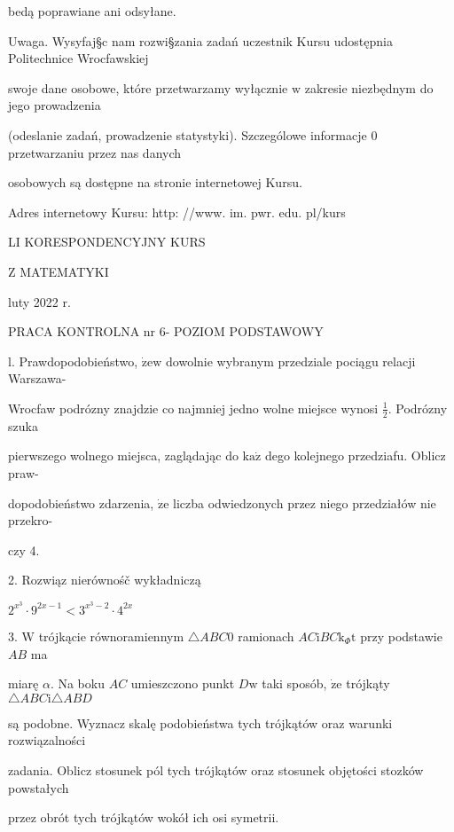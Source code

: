 \documentclass[a4paper,12pt]{article}
\begin{document}
bedą poprawiane ani odsyłane.

Uwaga. Wysyfaj\S c nam rozwi\S zania zadań uczestnik Kursu udostępnia Politechnice Wrocfawskiej

swoje dane osobowe, które przetwarzamy wyłącznie $\mathrm{w}$ zakresie niezbędnym do jego prowadzenia

(odeslanie zadań, prowadzenie statystyki). Szczególowe informacje $0$ przetwarzaniu przez nas danych

osobowych są dostępne na stronie internetowej Kursu.

Adres internetowy Kursu: http: //www. im. pwr. edu. pl/kurs







LI KORESPONDENCYJNY KURS

Z MATEMATYKI

luty 2022 r.

PRACA KONTROLNA nr 6- POZIOM PODSTAWOWY

l. Prawdopodobieństwo, $\dot{\mathrm{z}}\mathrm{e}\mathrm{w}$ dowolnie wybranym przedziale pociągu relacji Warszawa-

Wrocfaw podrózny znajdzie co najmniej jedno wolne miejsce wynosi $\displaystyle \frac{1}{2}$. Podrózny szuka

pierwszego wolnego miejsca, zaglądając do $\mathrm{k}\mathrm{a}\dot{\mathrm{z}}$ dego kolejnego przedziafu. Oblicz praw-

dopodobieństwo zdarzenia, $\dot{\mathrm{z}}\mathrm{e}$ liczba odwiedzonych przez niego przedziałów nie przekro-

czy 4.

2. Rozwiąz nierównośč wykładniczą

$2^{x^{3}}\cdot 9^{2x-1}<3^{x^{3}-2}\cdot 4^{2x}$

3. $\mathrm{W}$ trójkącie równoramiennym $\triangle ABC0$ ramionach $AC\mathrm{i}BC\mathrm{k}_{\Phi}\mathrm{t}$ przy podstawie $AB$ ma

miarę $\alpha$. Na boku $AC$ umieszczono punkt $D\mathrm{w}$ taki sposób, $\dot{\mathrm{z}}\mathrm{e}$ trójkąty $\triangle ABC\mathrm{i}\triangle ABD$

są podobne. Wyznacz skalę podobieństwa tych trójkątów oraz warunki rozwiązalności

zadania. Oblicz stosunek pól tych trójkątów oraz stosunek objętości stozków powstałych

przez obrót tych trójkątów wokół ich osi symetrii.
\end{document}
